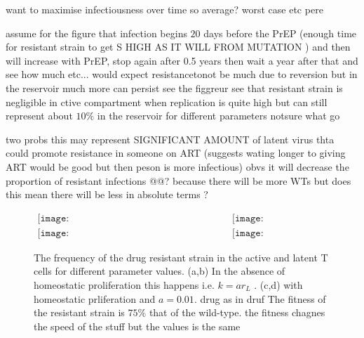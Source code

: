 \documentclass[DIV=15]{scrartcl}
\begin{document}
want to maximise infectiousness over time so average?
worst case etc pere 

assume for the figure that infection begins 
$20$ days before the PrEP (enough time for resistant strain to get S HIGH AS IT WILL  FROM MUTATION 	)  and then will  increase with PrEP, stop again  after 0.5  years then wait a year after that and see how much etc...      would expect resistancetonot be much due to  reversion but in the reservoir much more can persist see the figgreur
see that resistant strain is negligible in ctive compartment when replication  is quite high but can still  represent about $10\%$ in the reservoir for different parameters notsure  what go 

two  probs this may represent  SIGNIFICANT AMOUNT 	of latent virus thta could promote resistance in someone on ART (suggests wating longer to giving ART would be good but then peson is  more  infectious) obvs it will  decrease the proportion of resistant infections @@? because there will be more  WTs  but does  this mean there will be less in absolute terms ?




\begin{figure*}[h]
 \begin{center}$
 \begin{array}{cc}
 \texttt{[image: NoHomeo\_Active\_S1\_HigFit075\_09\_06b.png]} &
 \texttt{[image: NoHomeo\_Reservoir\_S1\_HigFit075\_09\_06b.png]} \\
  \texttt{[image: Homeo\_Active\_S1\_HigFit075\_09\_06b.png]} &
 \texttt{[image: Homeo\_Reservoir\_S1\_HigFit075\_09\_06b.png]}
 \end{array}$
 \end{center}
 \caption{The frequency of the drug resistant strain in the active and latent T cells for different parameter values. (a,b) In the absence of homeostatic proliferation this happens i.e. $k = ar_L$ . (c,d) with homeostatic prliferation and $a = 0.01$.  drug as in druf 
 The fitness of the resistant strain is $75\%$ that of the wild-type. the fitness chagnes  the speed  of the stuff but the values is the same  }
 \label{within host parameter sweep}
 \end{figure*} 
\end{document}
